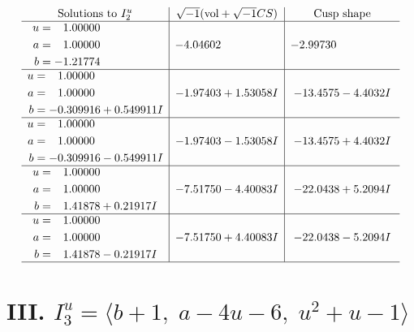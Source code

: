 \documentclass[1p]{elsarticle_modified}
\theoremstyle{definition}
\newcommand{\I}{\sqrt{-1}}
\begin{document}
$$\begin{array}{c|c|c}  
\text{Solutions to }I^u_{2}& \I (\text{vol} + \sqrt{-1}CS) & \text{Cusp shape}\\
 \hline 
\begin{aligned}
u &= \phantom{-}1.00000\phantom{ +0.000000I} \\
a &= \phantom{-}1.00000\phantom{ +0.000000I} \\
b &= -1.21774\phantom{ +0.000000I}\end{aligned}
 & -4.04602\phantom{ +0.000000I} & -2.99730\phantom{ +0.000000I} \\ \hline\begin{aligned}
u &= \phantom{-}1.00000\phantom{ +0.000000I} \\
a &= \phantom{-}1.00000\phantom{ +0.000000I} \\
b &= -0.309916 + 0.549911 I\end{aligned}
 & -1.97403 + 1.53058 I & -13.4575 - 4.4032 I \\ \hline\begin{aligned}
u &= \phantom{-}1.00000\phantom{ +0.000000I} \\
a &= \phantom{-}1.00000\phantom{ +0.000000I} \\
b &= -0.309916 - 0.549911 I\end{aligned}
 & -1.97403 - 1.53058 I & -13.4575 + 4.4032 I \\ \hline\begin{aligned}
u &= \phantom{-}1.00000\phantom{ +0.000000I} \\
a &= \phantom{-}1.00000\phantom{ +0.000000I} \\
b &= \phantom{-}1.41878 + 0.21917 I\end{aligned}
 & -7.51750 - 4.40083 I & -22.0438 + 5.2094 I \\ \hline\begin{aligned}
u &= \phantom{-}1.00000\phantom{ +0.000000I} \\
a &= \phantom{-}1.00000\phantom{ +0.000000I} \\
b &= \phantom{-}1.41878 - 0.21917 I\end{aligned}
 & -7.51750 + 4.40083 I & -22.0438 - 5.2094 I\\
 \hline 
 \end{array}$$\newpage\newpage\renewcommand{\arraystretch}{1}
\centering \section*{III. $I^u_{3}= \langle b+1,\;a-4 u-6,\;u^2+u-1 \rangle$}
\end{document}

